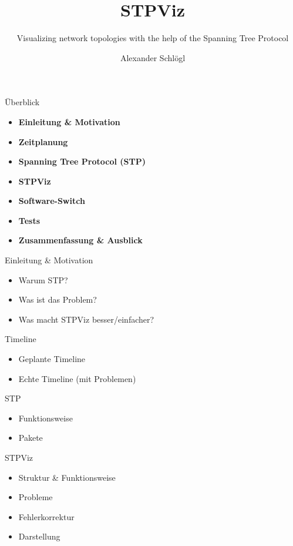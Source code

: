 \documentclass{beamer}
\title{STPViz}
\subtitle{Visualizing network topologies with the help of the Spanning Tree Protocol}
\author{Alexander Schlögl}
\begin{document}
\begin{frame}[plain]
    \maketitle
\end{frame}

\begin{frame}{Überblick}
    \begin{itemize}
        \item \textbf{Einleitung \& Motivation}
        \item \textbf{Zeitplanung}
        \item \textbf{Spanning Tree Protocol (STP)}
        \item \textbf{STPViz}
        \item \textbf{Software-Switch}
        \item \textbf{Tests}
        \item \textbf{Zusammenfassung \& Ausblick}
    \end{itemize}
\end{frame}

\begin{frame}{Einleitung \& Motivation}
    \begin{itemize}
        \item Warum STP?
        \item Was ist das Problem?
        \item Was macht STPViz besser/einfacher?
    \end{itemize}
\end{frame}

\begin{frame}{Timeline}
    \begin{itemize}
        \item Geplante Timeline
        \item Echte Timeline (mit Problemen)
    \end{itemize}
\end{frame}

\begin{frame}{STP}
    \begin{itemize}
        \item Funktionsweise
        \item Pakete
    \end{itemize}
\end{frame}

\begin{frame}{STPViz}
    \begin{itemize}
        \item Struktur \& Funktionsweise
        \item Probleme
        \item Fehlerkorrektur
        \item Darstellung
    \end{itemize}
\end{frame}
\end{document}
